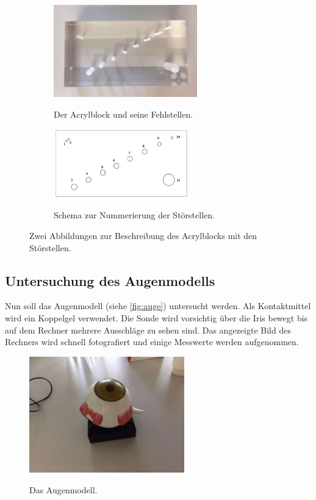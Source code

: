 \begin{figure}
    \begin{subfigure}{0.56\textwidth}
        \centering
        \includegraphics[height=4cm]{content/acrylblock_gedreht.pdf}
        \caption{Der Acrylblock und seine Fehlstellen.}\cite{anleitung}
        \label{fig:acrylblock}
    \end{subfigure}
\hfill
    \begin{subfigure}{0.40\textwidth}
        \centering
        \includegraphics[height=3cm]{content/schema_block.jpg}
        \caption{Schema zur Nummerierung der Störstellen.}\cite{altprotokoll}
        \label{fig:schemablock}
    \end{subfigure}
    \caption{Zwei Abbildungen zur Beschreibung des Acrylblocks mit den Störstellen.}
\end{figure}

\subsection{Untersuchung des Augenmodells}
\label{subsec:auge}
Nun soll das Augenmodell (siehe \autoref{fig:auge}) untersucht werden.
Als Kontaktmittel wird ein Koppelgel verwendet.
Die Sonde wird vorsichtig über die Iris bewegt bis auf dem Rechner mehrere Ausschläge zu sehen sind.
Das angezeigte Bild des Rechners wird schnell fotografiert und einige Messwerte werden aufgenommen.

\begin{figure}
    \centering
    \includegraphics[width=0.6\textwidth]{content/auge.pdf}
    \caption{Das Augenmodell.}\cite{anleitung}
    \label{fig:auge}
\end{figure}